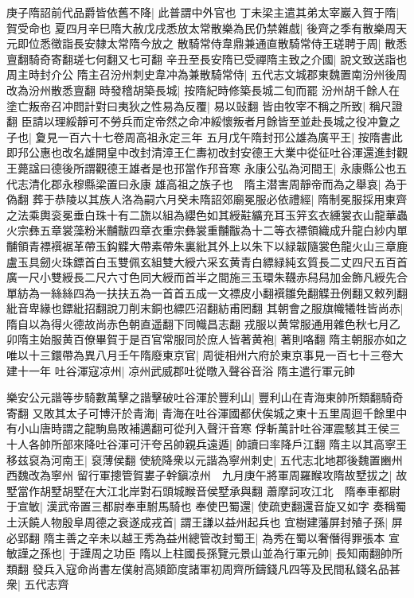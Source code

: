庚子隋詔前代品爵皆依舊不降|{
	此普謂中外官也}
丁未梁主遣其弟太宰巖入賀于隋|{
	賀受命也}
夏四月辛巳隋大赦戊戌悉放太常散樂為民仍禁雜戲|{
	後齊之季有散樂周天元即位悉徵詣長安隸太常隋今放之}
散騎常侍韋鼎兼通直散騎常侍王瑳聘于周|{
	散悉亶翻騎奇寄翻瑳七何翻又七可翻}
辛丑至長安隋已受禪隋主致之介國|{
	說文致送詣也周主時封介公}
隋主召汾州刺史韋冲為兼散騎常侍|{
	五代志文城郡東魏置南汾州後周改為汾州散悉亶翻}
時發稽胡築長城|{
	按隋紀時修築長城二旬而罷}
汾州胡千餘人在塗亡叛帝召冲問計對曰夷狄之性易為反覆|{
	易以䜴翻}
皆由牧宰不稱之所致|{
	稱尺證翻}
臣請以理綏靜可不勞兵而定帝然之命冲綏懷叛者月餘皆至並赴長城之役冲夐之子也|{
	夐見一百六十七卷周高祖永定三年}
五月戊午隋封邘公雄為廣平王|{
	按隋書此即䢴公惠也改名雄開皇中改封清漳王仁夀初改封安德王大業中從征吐谷渾還進封觀王薨諡曰德後所謂觀德王雄者是也邘當作䢴音寒}
永康公弘為河間王|{
	永康縣公也五代志清化郡永穆縣梁置曰永康}
雄高祖之族子也　隋主潜害周靜帝而為之舉哀|{
	為于偽翻}
葬于恭陵以其族人洛為嗣六月癸未隋詔郊廟冕服必依禮經|{
	隋制冕服採用東齊之法乘輿衮冕垂白珠十有二旒以組為纓色如其綬黈纊充耳玉笄玄衣纁裳衣山龍華蟲火宗彝五章裳藻粉米黼黻四章衣重宗彝裳重黼黻為十二等衣褾領織成升龍白紗内單黼領青褾襈裾革帶玉鈎䚢大帶素帶朱裏紕其外上以朱下以緑韍隨裳色龍火山三章鹿盧玉具劒火珠鏢首白玉雙佩玄組雙大綬六采玄黄青白縹緑純玄質長二丈四尺五百首廣一尺小雙綬長二尺六寸色同大綬而首半之間施三玉環朱韈赤舄舄加金飾凡綬先合單紡為一絲絲四為一扶扶五為一首首五成一文褾皮小翻襈雛免翻䚢丑例翻又敕列翻紕音卑緣也鏢紕招翻說刀削末銅也縹匹沼翻紡甫罔翻}
其朝會之服旗幟犧牲皆尚赤|{
	隋自以為得火德故尚赤色朝直遥翻下同幟昌志翻}
戎服以黄常服通用雜色秋七月乙卯隋主始服黄百僚畢賀于是百官常服同於庶人皆著黄袍|{
	著則咯翻}
隋主朝服亦如之唯以十三鐶帶為異八月壬午隋廢東京官|{
	周徙相州六府於東京事見一百七十三卷大建十一年}
吐谷渾寇凉州|{
	凉州武威郡吐從暾入聲谷音浴}
隋主遣行軍元帥

樂安公元諧等步騎數萬擊之諧擊破吐谷渾於豐利山|{
	豐利山在青海東帥所類翻騎奇寄翻}
又敗其太子可博汗於青海|{
	青海在吐谷渾國都伏俟城之東十五里周迴千餘里中有小山唐時謂之龍駒島敗補邁翻可從刋入聲汗音寒}
俘斬萬計吐谷渾震駭其王侯三十人各帥所部來降吐谷渾可汗夸呂帥親兵遠遁|{
	帥讀曰率降戶江翻}
隋主以其高寧王移兹裒為河南王|{
	裒薄侯翻}
使統降衆以元諧為寧州刺史|{
	五代志北地郡後魏置豳州西魏改為寧州}
留行軍摠管賀婁子幹鎭凉州　九月庚午將軍周羅睺攻隋故墅拔之|{
	故墅當作胡墅胡墅在大江北岸對石頭城睺音侯墅承與翻}
蕭摩訶攻江北　隋奉車都尉于宣敏|{
	漢武帝置三都尉奉車駙馬騎也}
奉使巴蜀還|{
	使疏吏翻還音旋又如字}
奏稱蜀土沃饒人物殷阜周德之衰遂成戎首|{
	謂王謙以益州起兵也}
宜樹建藩屏封殖子孫|{
	屏必郢翻}
隋主善之辛未以越王秀為益州總管改封蜀王|{
	為秀在蜀以奢僭得罪張本}
宣敏謹之孫也|{
	于謹周之功臣}
隋以上柱國長孫覽元景山並為行軍元帥|{
	長知兩翻帥所類翻}
發兵入寇命尚書左僕射高熲節度諸軍初周齊所鑄錢凡四等及民間私錢名品甚衆|{
	五代志齊}


